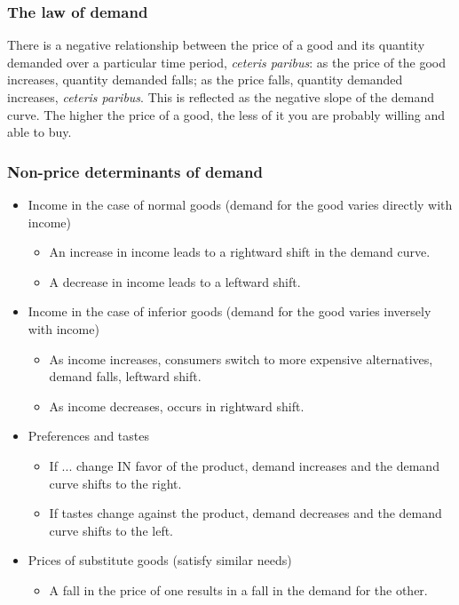 \documentclass[a4paper,12pt]{article}
\begin{document}
\subsubsection*{The law of demand}
There is a negative relationship between the price of a good and its quantity demanded over a particular time period, \emph{ceteris paribus}: as the price of the good increases, quantity demanded falls; as the price falls, quantity demanded increases, \emph{ceteris paribus}. This is reflected as the negative slope of the demand curve. The higher the price of a good, the less of it you are probably willing and able to buy. 
\subsubsection*{Non-price determinants of demand}
\begin{itemize}
  \item Income in the case of normal goods (demand for the good varies directly with income)
  \begin{itemize}
    \item An increase in income leads to a rightward shift in the demand curve.
    \item A decrease in income leads to a leftward shift.
  \end{itemize}
  \item Income in the case of inferior goods (demand for the good varies inversely with income)
  \begin{itemize}
    \item As income increases, consumers switch to more expensive alternatives, demand falls, leftward shift.
    \item As income decreases, occurs in rightward shift.
  \end{itemize}
  \item Preferences and tastes
  \begin{itemize}
    \item If ... change IN favor of the product, demand increases and the demand curve shifts to the right.
    \item If tastes change against the product, demand decreases and the demand curve shifts to the left.
  \end{itemize}
  \item Prices of substitute goods (satisfy similar needs)
  \begin{itemize}
    \item A fall in the price of one results in a fall in the demand for the other.

\end{itemize}
\end{itemize}
\end{document}

